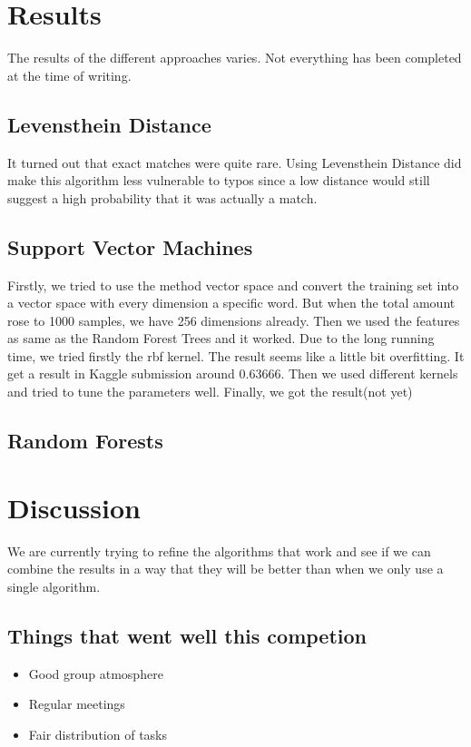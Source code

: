 \documentclass{article}
\begin{document}
\section{Results}

The results of the different approaches varies. Not everything has been completed at the time of writing.

\subsection{Levensthein Distance}
It turned out that exact matches were quite rare. Using Levensthein Distance did make this algorithm less vulnerable to typos since a low distance would still suggest a high probability that it was actually a match.

\subsection{Support Vector Machines}
Firstly, we tried to use the method vector space and convert the training set into a vector space with every dimension a specific word. But when the total amount rose to 1000 samples, we have 256 dimensions already. Then we used the features as same as the Random Forest Trees and it worked. Due to the long running time, we tried firstly the rbf kernel. The result seems like a little bit overfitting. It get a result in Kaggle submission around 0.63666. Then we used different kernels and tried to tune the parameters well. Finally, we got the result(not yet)

\subsection{Random Forests}

\section{Discussion}

We are currently trying to refine the algorithms that work and see if we can combine the results in a way that they will be better than when we only use a single algorithm.\\

\subsection{Things that went well this competion}

\begin{itemize}
\item Good group atmosphere
\item Regular meetings
\item Fair distribution of tasks
\end{itemize}
\end{document}
